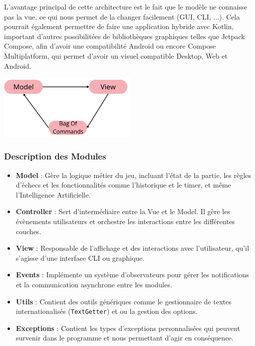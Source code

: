 \documentclass{article}
\begin{document}
L'avantage principal de cette architecture est le fait que le modèle ne connaisse pas la vue, ce qui nous permet de la changer facilement (GUI, CLI, ...).
Cela pourrait également permettre de faire une application hybride avec Kotlin, important d'autres possibilitées de bibliothèques graphiques telles que Jetpack Compose,
afin d'avoir une compatibilité Android ou encore Compose Multiplatform, qui permet d'avoir un visuel compatible Desktop, Web et Android.

\begin{center}
    \includegraphics[width=0.5\textwidth]{MVC}
\end{center}

\subsubsection{Description des Modules}

\begin{itemize}
    \item \textbf{Model} : Gère la logique métier du jeu, incluant l'état de la partie, les règles d'échecs et les fonctionnalités comme l'historique et le timer, et même l'Intelligence Artificielle.
    \item \textbf{Controller} : Sert d'intermédiaire entre la Vue et le Model. Il gère les évènements utilisateurs et orchestre les interactions entre les différentes couches.
    \item \textbf{View} : Responsable de l'affichage et des interactions avec l'utilisateur, qu'il s'agisse d'une interface CLI ou graphique.
    \item \textbf{Events} : Implémente un système d'observateurs pour gérer les notifications et la communication asynchrone entre les modules.
    \item \textbf{Utils} : Contient des outils génériques comme le gestionnaire de textes internationalisés (\texttt{TextGetter}) et ou la gestion des options.
    \item \textbf{Exceptions} : Contient les types d'exceptions personnalisées qui peuvent survenir dans le programme et nous permettant d'agir en conséquence.
\end{itemize}
\end{document}
